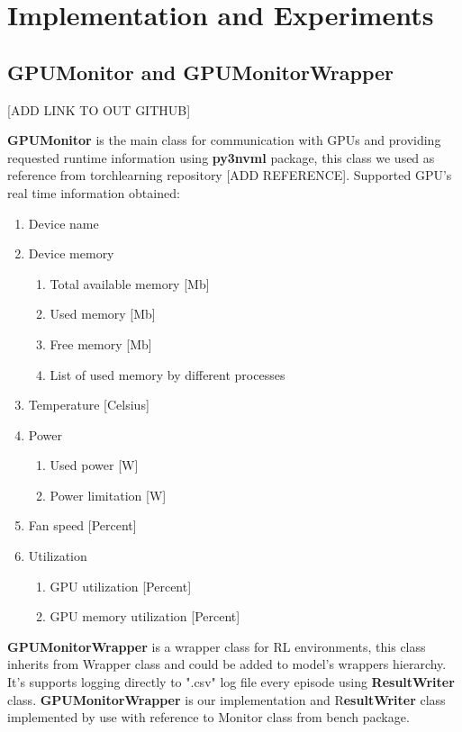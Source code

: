 \documentclass[11 pt, twocolumn]{article}
\begin{document}
\section{Implementation and Experiments}
\subsection{GPUMonitor and GPUMonitorWrapper}
[ADD LINK TO OUT GITHUB]


\textbf{GPUMonitor} is the main class for communication with GPUs and providing requested runtime information using \textbf{py3nvml} package, this class we used as reference from 
torchlearning repository [ADD REFERENCE].
Supported GPU's real time information obtained: 
\begin{enumerate}
\item Device name
\item Device memory
\begin{enumerate}
\item Total available memory [Mb]
\item Used memory [Mb]
\item Free memory [Mb]
\item List of used memory by different processes 
\end{enumerate}
\item Temperature [Celsius]
\item Power
\begin{enumerate}
\item Used power [W]
\item Power limitation [W]
\end{enumerate}
\item Fan speed [Percent]
\item Utilization
\begin{enumerate}
\item GPU utilization [Percent]
\item GPU memory utilization [Percent]
\end{enumerate}
\end{enumerate}


\textbf{GPUMonitorWrapper} is a wrapper class for RL environments, this class inherits from Wrapper class and could be added to model's wrappers hierarchy. It's supports logging directly to ".csv" log file every episode using \textbf{ResultWriter} class. \textbf{GPUMonitorWrapper} is our implementation and R\textbf{esultWriter} class implemented by use with reference to Monitor class from bench package.
\end{document}

